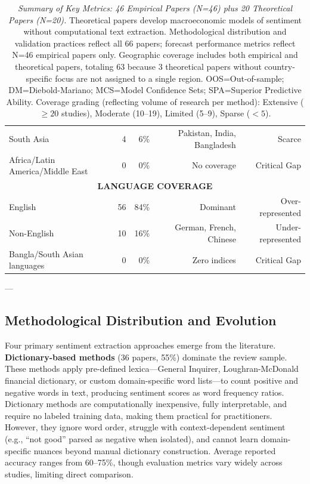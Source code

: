 \documentclass[11pt,twocolumn]{article}
\begin{document}
\begin{table}[t]
{\begin{tabular}{|l|r|r|r|r|}
South Asia & 4 & 6\% & Pakistan, India, Bangladesh & Scarce \\
Africa/Latin America/Middle East & 0 & 0\% & No coverage & Critical Gap \\
\hline
\multicolumn{5}{|c|}{\textbf{LANGUAGE COVERAGE}} \\
\hline
English & 56 & 84\% & Dominant & Over-represented \\
Non-English & 10 & 16\% & German, French, Chinese & Under-represented \\
Bangla/South Asian languages & 0 & 0\% & Zero indices & Critical Gap \\
\hline
\end{tabular}
}%
\caption{\textit{Summary of Key Metrics: 46 Empirical Papers (N=46) plus 20 Theoretical Papers (N=20).} Theoretical papers develop macroeconomic models of sentiment without computational text extraction. Methodological distribution and validation practices reflect all 66 papers; forecast performance metrics reflect N=46 empirical papers only. Geographic coverage includes both empirical and theoretical papers, totaling 63 because 3 theoretical papers without country-specific focus are not assigned to a single region. OOS=Out-of-sample; DM=Diebold-Mariano; MCS=Model Confidence Sets; SPA=Superior Predictive Ability. Coverage grading (reflecting volume of research per method): Extensive ($\geq 20$ studies), Moderate (10--19), Limited (5--9), Sparse ($<5$).}
\label{tab:metasummary}
\end{table}

---

\subsection{Methodological Distribution and Evolution}

Four primary sentiment extraction approaches emerge from the literature. \textbf{Dictionary-based methods} (36 papers, 55\%) dominate the review sample. These methods apply pre-defined lexica---General Inquirer, Loughran-McDonald financial dictionary, or custom domain-specific word lists---to count positive and negative words in text, producing sentiment scores as word frequency ratios. Dictionary methods are computationally inexpensive, fully interpretable, and require no labeled training data, making them practical for practitioners. However, they ignore word order, struggle with context-dependent sentiment (e.g., ``not good'' parsed as negative when isolated), and cannot learn domain-specific nuances beyond manual dictionary construction. Average reported accuracy ranges from 60--75\%, though evaluation metrics vary widely across studies, limiting direct comparison.
\end{document}

